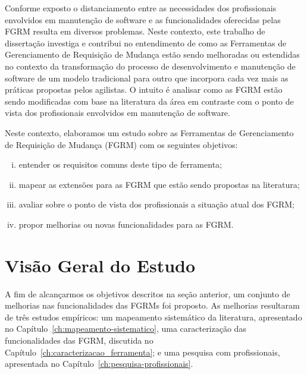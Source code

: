 Conforme exposto o distanciamento entre as necessidades dos profissionais
envolvidos em manutenção de software e as funcionalidades oferecidas pelas FGRM
resulta em diversos problemas. Neste contexto, este trabalho de dissertação
investiga e contribui no entendimento de como as Ferramentas de Gerenciamento de
Requisição de Mudança estão sendo melhoradas ou estendidas no contexto da
transformação do processo de desenvolvimento e manutenção de software de um
modelo tradicional para outro que incorpora cada vez mais as práticas propostas
pelos agilistas. O intuito é analisar como as FGRM estão sendo modificadas com
base na literatura da área em contraste com o ponto de vista dos profissionais
envolvidos em manutenção de software.

Neste contexto, elaboramos um estudo sobre as Ferramentas de Gerenciamento de
Requisição de Mudança (FGRM) com os seguintes objetivos:
\begin{enumerate}[(i)]
	\item entender os requisitos comuns deste tipo de ferramenta;
	\item mapear as extensões para as FGRM que estão sendo propostas na
		literatura;
	\item avaliar sobre o ponto de vista dos profissionais a
		situação atual dos FGRM\@;
	\item propor melhorias ou novas funcionalidades para as FGRM\@.
\end{enumerate}


\section{Visão Geral do Estudo}
\label{sec:intro-visao-geral}


A fim de alcançarmos os objetivos descritos na seção anterior, um conjunto de
melhorias nas funcionalidades das FGRMs foi proposto. As melhorias resultaram
de três estudos empíricos: um mapeamento sistemático da literatura, apresentado
no Capítulo~\ref{ch:mapeamento-sistematico}, uma caracterização das
funcionalidades das FGRM, discutida no
Capítulo~\ref{ch:caracterizacao_ferramenta}; e uma pesquisa com profissionais,
apresentada no Capítulo~\ref{ch:pesquisa-profissionais}.

